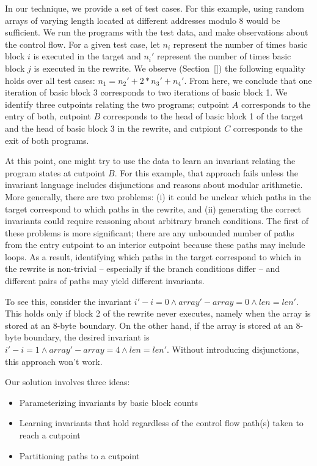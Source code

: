In our technique, we provide a set of test cases. For this example,
using random arrays of varying length located at different addresses
modulo 8 would be sufficient. We run the programs with the test data,
and make observations about the control flow. For a given test case,
let $n_i$ represent the number of times basic block $i$ is executed in
the target and $n_i'$ represent the number of times basic block $j$
is executed in the rewrite. We observe (Section~\ref{}) the following
equality holds over all test cases: $n_1 = n_2' + 2*n_3' + n_4'$. From
here, we conclude that one iteration of basic block 3 corresponds
to two iterations of basic block 1. We identify three cutpoints
relating the two programs; cutpoint $A$ corresponds to the entry of
both, cutpoint $B$ corresponds to the head of basic block 1 of the
target and the head of basic block 3 in the rewrite, and cutpiont $C$
corresponds to the exit of both programs.

At this point, one might try to use the data to learn an invariant
relating the program states at cutpoint $B$. For this example, that
approach fails unless the invariant language includes disjunctions
and reasons about modular arithmetic. More generally, there are two
problems: (i) it could be unclear which paths in the target
correspond to which paths in the rewrite, and (ii) generating the
correct invariants could require reasoning about arbitrary branch
conditions. The first of these problems is more significant; there
are any unbounded number of paths from the entry cutpoint to an
interior cutpoint because these paths may include loops.  As a result,
identifying which paths in the target correspond to which in the
rewrite is non-trivial -- especially if the branch conditions differ
-- and different pairs of paths may yield different invariants.

To see this, consider the invariant $i' - i = 0 \wedge array' - array
= 0 \wedge len = len'$. This holds only if block 2 of the rewrite
never executes, namely when the array is stored at an 8-byte boundary.
On the other hand, if the array is stored at an 8-byte boundary, the
desired invariant is $i' - i = 1 \wedge array' - array = 4 \wedge len
= len'$. Without introducing disjunctions, this approach won't work.

Our solution involves three ideas:

\begin{itemize}
\item Parameterizing invariants by basic block counts
\item Learning invariants that hold regardless of the control flow path(s) taken to reach a cutpoint
\item Partitioning paths to a cutpoint 
\end{itemize}

